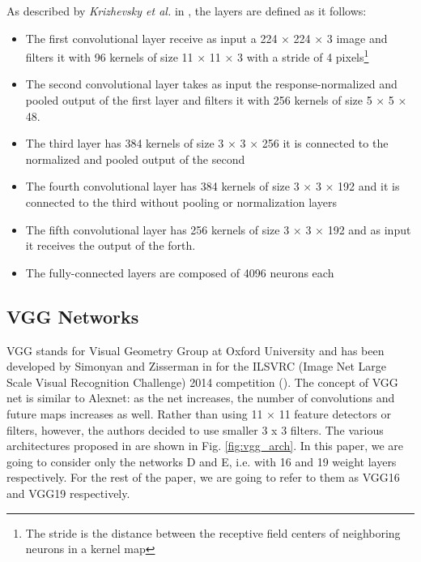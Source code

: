 As described by \textit{Krizhevsky et al.} in \cite{NIPS2012_c399862d}, the layers are defined as it follows:

\begin{itemize}
\item The first convolutional layer receive as input a 224 × 224 × 3  image and filters it with 96 kernels of size 11 × 11 × 3 with a stride of 4 pixels\footnote{The stride is the distance between the receptive field centers of neighboring neurons in a kernel map}
\item The second convolutional layer takes as input the response-normalized and pooled output of the first layer and filters it with 256 kernels of size 5 × 5 × 48.
\item The third layer has 384 kernels of size 3 × 3 × 256 it is connected to the normalized and pooled output of the second
\item The fourth convolutional layer has 384 kernels of size 3 × 3 × 192 and it is connected to the third without pooling or normalization layers
\item The fifth convolutional layer has 256 kernels of size 3 × 3 × 192 and as input it receives the output of the forth. 
\item The fully-connected layers are composed of 4096 neurons each
\end{itemize}
\subsection{VGG Networks}\label{sec:VGG}
VGG stands for Visual Geometry Group at Oxford University and has been developed by Simonyan and Zisserman in \cite{simonyan2015deep} for the 
ILSVRC (Image Net Large Scale Visual Recognition Challenge) 2014 competition
(\cite{DBLP:journals/corr/RussakovskyDSKSMHKKBBF14}). 
The concept of VGG net is similar to Alexnet: as the net increases, the number of convolutions and future maps increases as well. Rather than using 11 × 11 feature detectors or filters, however, the authors decided to use smaller 3 x 3  filters. The various architectures proposed in \cite{simonyan2015deep} are shown in Fig. \ref{fig:vgg_arch}. In this paper, we are going to consider only the networks D and E, i.e. with 16 and 19 weight layers respectively. For the rest of the paper, we are going to refer to them as VGG16 and VGG19 respectively. 

